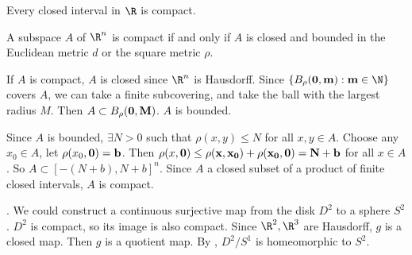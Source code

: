  Every closed interval in \(\R\) is compact.

 A subspace \(A\) of \(\R^n\) is compact if and only if \(A\) is closed and bounded in the Euclidean metric \(d\) or the square metric \(\rho\).

\pf \note{\mimp} If \(A\) is compact, \(A\) is closed since \(\R^n\) is Hausdorff. Since \(\{B_\rho(\bf{0}, m) : m \in \N\}\) covers \(A\), we can take a finite subcovering, and take the ball with the largest radius \(M\). Then \(A \subset B_\rho(\bf{0}, M)\). \(A\) is bounded.

\note{\mimpd} Since \(A\) is bounded, \(\exists N > 0\) such that \(\rho(x, y) \leq N\) for all \(x, y \in A\). Choose any \(x_0 \in A\), let \(\rho(x_0, \bf{0}) = b\). Then \(\rho(x, \bf{0}) \leq \rho(x, x_0) + \rho(x_0 , \bf{0}) = N +b\) for all \(x \in A\). So \(A \subset [-(N + b), N + b]^n\). Since \(A\) a closed subset of a product of finite closed intervals, \(A\) is compact.

\prob. We could construct a continuous surjective map from the disk \(D^2\) to a sphere \(S^2\). \(D^2\) is compact, so its image is also compact. Since \(\R^2, \R^3\) are Hausdorff, \(g\) is a closed map. Then \(g\) is a quotient map. By , \(D^2 / S^1\) is homeomorphic to \(S^2\).

\pagebreak
